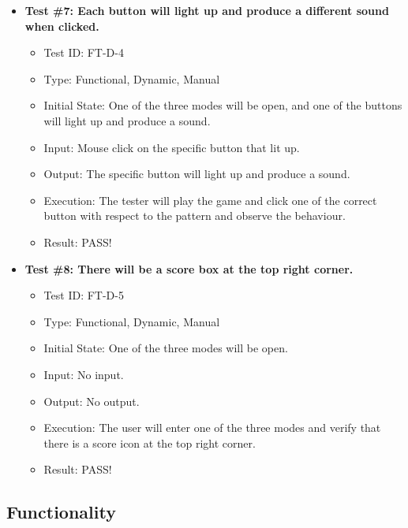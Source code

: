 \documentclass[12pt, titlepage]{article}
\begin{document}
\begin{itemize}
\item \textbf{Test \#7: Each button will light up and produce a different sound when clicked.}
\begin{itemize}
\item Test ID: FT-D-4
\item Type: Functional, Dynamic, Manual 		
\item Initial State: One of the three modes will be open, and one of the buttons will light up and produce a sound.\item Input: Mouse click on the specific button that lit up. 					
\item Output: The specific button will light up and produce a sound.					
\item Execution: The tester will play the game and click one of the correct button with respect to the pattern and observe the behaviour.
\item Result: PASS!
\end{itemize}

\item \textbf{Test \#8: There will be a score box at the top right corner.}
\begin{itemize}
\item Test ID: FT-D-5
\item Type: Functional, Dynamic, Manual 		
\item Initial State: One of the three modes will be open. 					
\item Input: No input.					
\item Output: No output. 					
\item Execution: The user will enter one of the three modes and verify that there is a score icon at the top right corner.  
\item Result: PASS!
\end{itemize}

\end{itemize}

\subsection{Functionality}
\end{document}
